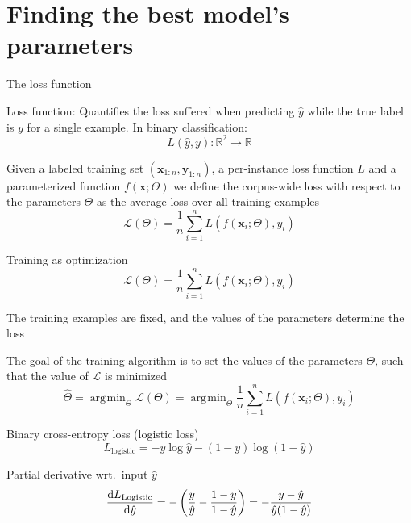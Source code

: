 \documentclass[12pt,aspectratio=169,handout]{beamer}
\DeclareMathOperator*{\argmin}{arg\!\min}
\begin{document}
\section{Finding the best model's parameters}

\begin{frame}{The loss function}
	
Loss function: Quantifies the loss suffered when predicting $\hat{y}$ while the true label is $y$ for a single example. In binary classification: \pause
$$
L(\hat{y}, y): \mathbb{R}^2 \to \mathbb{R}
$$

\pause
Given a labeled training set 
$(\bm{x}_{1:n}, \bm{y}_{1:n})$, 
a per-instance loss function $L$ and a
parameterized function $f(\bm{x}; \Theta)$ we define the corpus-wide loss with respect to the parameters $\Theta$ as the average loss over all training examples \pause
$$
\mathcal{L}(\Theta) = \frac{1}{n} \sum_{i =1}^{n} L (f(\bm{x}_i; \Theta), y_i)
$$
\end{frame}

\begin{frame}{Training as optimization}
$$
\mathcal{L}(\Theta) = \frac{1}{n} \sum_{i =1}^{n} L (f(\bm{x}_i; \Theta), y_i)
$$

The training examples are fixed, and the values of the parameters determine the loss

\pause
The goal of the training algorithm is to set the values of the parameters $\Theta$‚ such that
the value of $\mathcal{L}$ is minimized \pause
$$
\hat{\Theta} = \argmin_{\Theta} \mathcal{L}(\Theta) = \argmin_{\Theta} \frac{1}{n} \sum_{i =1}^{n} L (f(\bm{x}_i; \Theta), y_i)
$$


\end{frame}

\begin{frame}{Binary cross-entropy loss (logistic loss)}
$$
L_{\text{logistic}} = - y \log \hat{y} - (1 - y) \log (1 - \hat{y})
$$

\pause
\begin{block}{Partial derivative wrt.\ input $\hat{y}$}
$$
\dv{L_{\text{Logistic}}}{\hat{y}} =
- \left(
\frac{y}{\hat{y}} - \frac{1 - y}{1 - \hat{y}}
\right)
=
- \frac{y - \hat{y}}{ \hat{y} (1 - \hat{y})}
$$
\end{block}

\end{frame}
\end{document}
